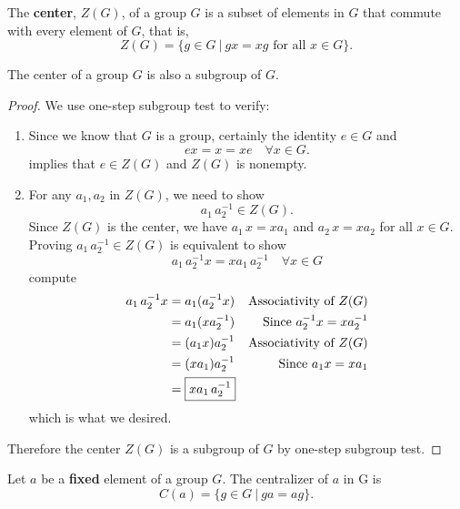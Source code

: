 \begin{definition}
    The \textbf{center}, $Z(G)$, of a group $G$ is a subset of elements in $G$ that commute with every element of $G$, that is, 
    \begin{equation}
        Z(G) = \{ g \in G \> | \> gx = xg \text{ for all } x \in G \}.
    \end{equation}
\end{definition}

\begin{lemma}
    The center of a group $G$ is also a subgroup of $G$.
\end{lemma}
\begin{proof}
    We use one-step subgroup test to verify:
    \begin{enumerate}
        \item Since we know that $G$ is a group, certainly the identity $e \in G$ and 
            \[
                ex = x = xe \quad \forall x \in G.
            \]
            implies that $e \in Z(G)$ and $Z(G)$ is nonempty.
        \item For any $a_1, a_2$ in $Z(G)$, we need to show 
            \[
                a_1\, a_2^{-1} \in Z(G).
            \]
            Since $Z(G)$ is the center, we have $a_1\, x = x a_1$ and $a_2\, x = x a_2$ for all $x \in G$.
            Proving $a_1\, a_2^{-1} \in Z(G)$ is equivalent to show
            \[
                a_1\, a_2^{-1} x = x a_1\, a_2^{-1} \quad \forall x \in G
            \]
            compute
            \begin{align*}
                a_1\, a_2^{-1} x &= a_1 (a_2^{-1} x) & \text{Associativity of } Z(G)\\
                &= a_1 (x a_2^{-1}) & \text{Since } a_2^{-1} x = x a_2^{-1}\\
                &= (a_1 x) a_2^{-1} & \text{Associativity of } Z(G)\\
                &= (x a_1)a_2^{-1} & \text{Since } a_1 x = x a_1\\
                &= \fbox{$x a_1\, a_2^{-1}$}
            \end{align*}
            which is what we desired.
    \end{enumerate}

    Therefore the center $Z(G)$ is a subgroup of $G$ by one-step subgroup test.
\end{proof}

\begin{definition}
    Let $a$ be a \textbf{fixed} element of a group $G$. The centralizer of $a$ in G is 
    \begin{equation}
        C(a) = \{ g \in G \> | \> ga = ag\}.
    \end{equation}
\end{definition}

